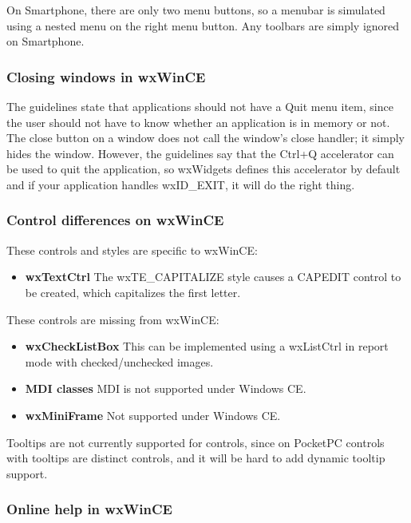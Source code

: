 On Smartphone, there are only two menu buttons, so a menubar is simulated
using a nested menu on the right menu button. Any toolbars are simply ignored on
Smartphone.

\subsubsection{Closing windows in wxWinCE}

The guidelines state that applications should not have a Quit menu item,
since the user should not have to know whether an application is in memory
or not. The close button on a window does not call the window's
close handler; it simply hides the window. However, the guidelines say that
the Ctrl+Q accelerator can be used to quit the application, so wxWidgets
defines this accelerator by default and if your application handles
wxID\_EXIT, it will do the right thing.

\subsubsection{Control differences on wxWinCE}

These controls and styles are specific to wxWinCE:

\itemsep=0pt
\begin{itemize}
\item {\bf wxTextCtrl} The wxTE\_CAPITALIZE style causes a CAPEDIT control to
be created, which capitalizes the first letter.
\end{itemize}

These controls are missing from wxWinCE:

\itemsep=0pt
\begin{itemize}
\item {\bf wxCheckListBox} This can be implemented using a wxListCtrl in report mode
with checked/unchecked images.
\item {\bf MDI classes} MDI is not supported under Windows CE.
\item {\bf wxMiniFrame} Not supported under Windows CE.
\end{itemize}

Tooltips are not currently supported for controls, since on PocketPC controls with
tooltips are distinct controls, and it will be hard to add dynamic
tooltip support.

\subsubsection{Online help in wxWinCE}

